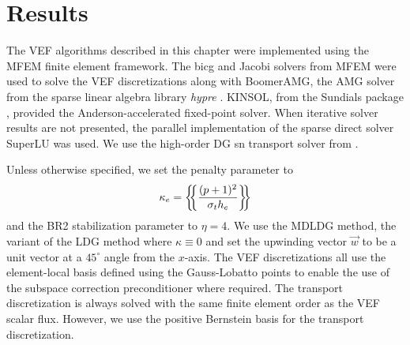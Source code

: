 \documentclass[../doc.tex]{subfiles}
\begin{document}
\section{Results}
The VEF algorithms described in this chapter were implemented using the MFEM \cite{MFEM,mfem-web} finite element framework. The \gls{bicg} and Jacobi solvers from MFEM were used to solve the VEF discretizations along with BoomerAMG, the AMG solver from the sparse linear algebra library \emph{hypre} \cite{hypre}. KINSOL, from the Sundials package \cite{hindmarsh2005sundials}, provided the Anderson-accelerated fixed-point solver. When iterative solver results are not presented, the parallel implementation of the sparse direct solver SuperLU \cite{lidemmel03} was used. We use the high-order DG \gls{sn} transport solver from \cite{graph_sweeps}.

Unless otherwise specified, we set the penalty parameter to 
	\begin{equation}
		\kappa_e = \left\{\!\!\left\{\frac{(p+1)^2}{\sigma_t h_e}\right\}\!\!\right\} 
	\end{equation}
and the BR2 stabilization parameter to $\eta = 4$. We use the MDLDG method, the variant of the LDG method where $\kappa \equiv 0$ and set the upwinding vector $\vec{w}$ to be a unit vector at a $45^\circ$ angle from the $x$-axis. The VEF discretizations all use the element-local basis defined using the Gauss-Lobatto points to enable the use of the subspace correction preconditioner where required. The transport discretization is always solved with the same finite element order as the VEF scalar flux. However, we use the positive Bernstein basis \cite{doi:10.1137/11082539X} for the transport discretization. 
\end{document}
